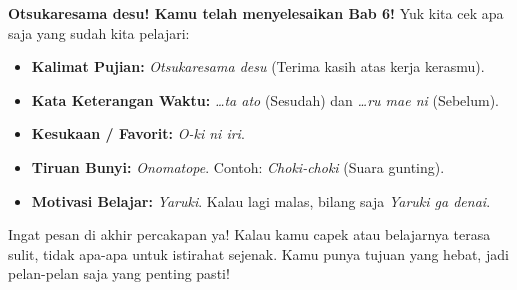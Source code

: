 \vspace{2em}
\begin{tcolorbox}[
    colback=blue!5!white,
    colframe=blue!80!black,
    boxrule=3pt,
    arc=5mm,
    title={\huge\bfseries \sffamily 🌟 Rangkuman Bab 6 🌟},
    fonttitle=\color{white},
    attach boxed title to top center={yshift=-4mm},
    boxed title style={colback=blue!80!black, rounded corners},
    left=5mm, right=5mm, top=7mm, bottom=5mm
]
\Large \textbf{Otsukaresama desu! Kamu telah menyelesaikan Bab 6!} Yuk kita cek apa saja yang sudah kita pelajari:
\begin{itemize}
    \item \textbf{Kalimat Pujian:} \textit{Otsukaresama desu} (Terima kasih atas kerja kerasmu).
    \item \textbf{Kata Keterangan Waktu:} \textit{\dots ta ato} (Sesudah) dan \textit{\dots ru mae ni} (Sebelum).
    \item \textbf{Kesukaan / Favorit:} \textit{O-ki ni iri}.
    \item \textbf{Tiruan Bunyi:} \textit{Onomatope}. Contoh: \textit{Choki-choki} (Suara gunting).
    \item \textbf{Motivasi Belajar:} \textit{Yaruki}. Kalau lagi malas, bilang saja \textit{Yaruki ga denai}.
\end{itemize}
Ingat pesan di akhir percakapan ya! Kalau kamu capek atau belajarnya terasa sulit, tidak apa-apa untuk istirahat sejenak. Kamu punya tujuan yang hebat, jadi pelan-pelan saja yang penting pasti!
\end{tcolorbox}

\newpage